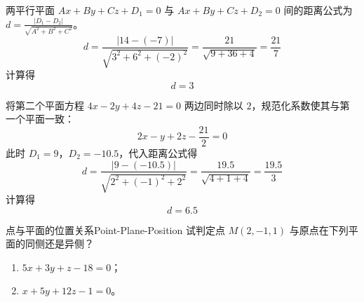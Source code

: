 \begin{solution}

    两平行平面 $Ax + By + Cz + D_1 = 0$ 与 $Ax + By + Cz + D_2 = 0$ 间的距离公式为 $d = \frac{|D_1 - D_2|}{\sqrt{A^2 + B^2 + C^2}}$。
    \begin{equation}
        d = \frac{|14 - (-7)|}{\sqrt{3^2 + 6^2 + (-2)^2}} = \frac{21}{\sqrt{9 + 36 + 4}} = \frac{21}{7}
    \end{equation}
    计算得
    \begin{equation}
        \boxed{d = 3}
    \end{equation}


    将第二个平面方程 $4x - 2y + 4z - 21 = 0$ 两边同时除以 $2$，规范化系数使其与第一个平面一致：
    \begin{equation}
        2x - y + 2z - \frac{21}{2} = 0
    \end{equation}
    此时 $D_1 = 9$，$D_2 = -10.5$，代入距离公式得
    \begin{equation}
        d = \frac{|9 - (-10.5)|}{\sqrt{2^2 + (-1)^2 + 2^2}} = \frac{19.5}{\sqrt{4 + 1 + 4}} = \frac{19.5}{3}
    \end{equation}
    计算得
    \begin{equation}
        \boxed{d = 6.5}
    \end{equation}
\end{solution}


\begin{problem}{点与平面的位置关系}{Point-Plane-Position}
    试判定点 $M(2, -1, 1)$ 与原点在下列平面的同侧还是异侧？
    \begin{enumerate}
        \item $5x + 3y + z - 18 = 0$；
        \item $x + 5y + 12z - 1 = 0$。
    \end{enumerate}
\end{problem}

